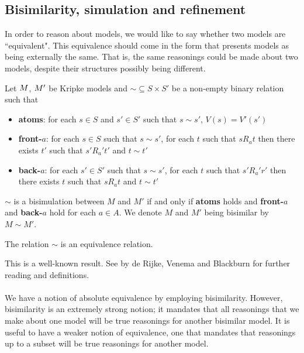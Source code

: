 \subsection{Bisimilarity, simulation and refinement}

In order to reason about models, we would like to say whether two models are ``equivalent".
This equivalence should come in the form that presents models as being externally the same.
That is, the same reasonings could be made about two models, despite their structures possibly being
different.

\begin{defn} \label{bisimKripke}
	Let $M$, $M'$ be Kripke models and $\sim \subseteq S \times S'$ be a non-empty binary
	relation such that
	\begin{itemize}
		\item {\bf atoms}: for each $s \in S$ and $s' \in S'$ such that $s \sim s'$, $V(s) = V'(s')$
		\item {\bf front-$a$}: for each $s \in S$ such that $s \sim s'$, for each $t$ such that
		$s R_a t$ then there exists $t'$ such that $s' R_a' t'$ and $t \sim t'$
		\item {\bf back-$a$}: for each $s' \in S'$ such that $s \sim s'$, for each $t$ such that
		$s' R_a' r'$ then there exists $t$ such that $s R_a t$ and $t \sim t'$
	\end{itemize}
	$\sim$ is a bisimulation between $M$ and $M'$ if and only if {\bf atoms} holds and {\bf front-$a$}
	and {\bf back-$a$} hold for each $a \in A$.
	We denote $M$ and $M'$ being bisimilar by $M \sim M'$.
\end{defn}

\begin{lemma} \label{bisimEquivalence}
	The relation $\sim$ is an equivalence relation.
\end{lemma}

This is a well-known result.
See \cite{blackburn2002modal} by de Rijke, Venema and Blackburn for further reading and
definitions.\\
\\
We have a notion of absolute equivalence by employing bisimilarity.
However, bisimilarity is an extremely strong notion; it mandates that all reasonings that we make
about one model will be true reasonings for another bisimilar model.
It is useful to have a weaker notion of equivalence, one that mandates that reasonings up to a
subset will be true reasonings for another model.

